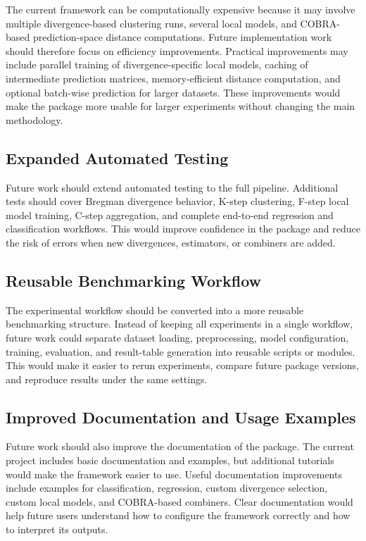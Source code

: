 \hs The current framework can be computationally expensive because it may involve multiple divergence-based clustering runs, several local models, and COBRA-based prediction-space distance computations. Future implementation work should therefore focus on efficiency improvements. Practical improvements may include parallel training of divergence-specific local models, caching of intermediate prediction matrices, memory-efficient distance computation, and optional batch-wise prediction for larger datasets. These improvements would make the package more usable for larger experiments without changing the main methodology.

\subsection{Expanded Automated Testing}

\hs Future work should extend automated testing to the full \KFCProcedure{} pipeline. Additional tests should cover Bregman divergence behavior, K-step clustering, F-step local model training, C-step aggregation, and complete end-to-end regression and classification workflows. This would improve confidence in the package and reduce the risk of errors when new divergences, estimators, or combiners are added.

\subsection{Reusable Benchmarking Workflow}

\hs The experimental workflow should be converted into a more reusable benchmarking structure. Instead of keeping all experiments in a single workflow, future work could separate dataset loading, preprocessing, model configuration, training, evaluation, and result-table generation into reusable scripts or modules. This would make it easier to rerun experiments, compare future package versions, and reproduce results under the same settings.

\subsection{Improved Documentation and Usage Examples}

\hs Future work should also improve the documentation of the package. The current project includes basic documentation and examples, but additional tutorials would make the framework easier to use. Useful documentation improvements include examples for classification, regression, custom divergence selection, custom local models, and COBRA-based combiners. Clear documentation would help future users understand how to configure the framework correctly and how to interpret its outputs.

